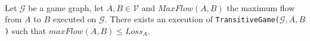 \begin{lemma} \ \\
  \label{maxflowgame}
  Let $\mathcal{G}$ be a game graph, let $A, B \in \mathcal{V}$ and $MaxFlow\left(A, B\right)$ the maximum flow from
  $A$ to $B$ executed on $\mathcal{G}$. There exists an execution of
  \texttt{TransitiveGame(}$\mathcal{G}, A, B$\texttt{)} such that $maxFlow\left(A, B\right) \leq Loss_A$.
\end{lemma}
